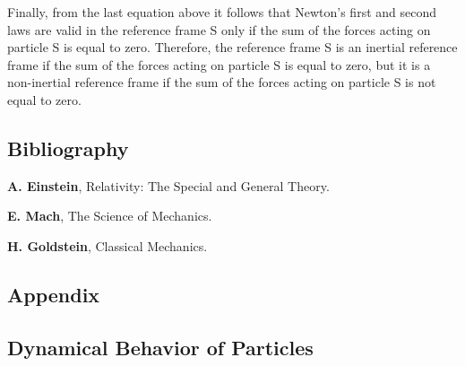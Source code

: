 \documentclass[12pt]{article}
\begin{document}
\vspace{+0.27em}

\par Finally, from the last equation above it follows that Newton's first and second laws are valid in the reference frame S only if the sum of the forces acting on particle S is equal to zero. Therefore, the reference frame S is an inertial reference frame if the sum of the forces acting on particle S is equal to zero, but it is a non-inertial reference frame if the sum of the forces acting on particle S is not equal to zero.

\vspace{+0.45em}

{\centering\subsection*{Bibliography}}

\smallskip

\par \textbf{A. Einstein}, Relativity: The Special and General Theory.
\bigskip
\par \textbf{E. Mach}, The Science of Mechanics.
\bigskip
\par \textbf{H. Goldstein}, Classical Mechanics.

\newpage

{\centering\subsection*{Appendix}}

{\centering\subsection*{Dynamical Behavior of Particles}}
\end{document}
